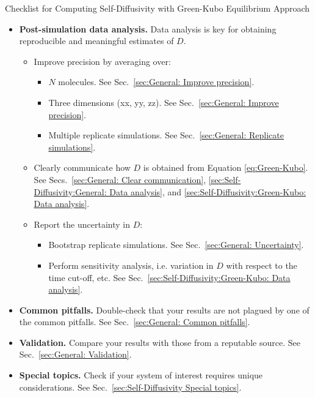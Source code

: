 \documentclass[9pt,bestpractices]{livecoms}
\begin{document}
\begin{Checklists*}[p!]
\begin{checklist}{Checklist for Computing Self-Diffusivity with Green-Kubo Equilibrium Approach}
\begin{itemize}
			\item
			\textbf{Post-simulation data analysis.} Data analysis is key for obtaining reproducible and meaningful estimates of $D$.
			\begin{itemize}
				\item Improve precision by averaging over:
				\begin{itemize}
					\item $N$ molecules. See Sec.\ \ref{sec:General: Improve precision}.
					\item Three dimensions (xx, yy, zz). See Sec.\ \ref{sec:General: Improve precision}.
					\item Multiple replicate simulations. See Sec.\ \ref{sec:General: Replicate simulations}.
				\end{itemize}
				\item Clearly communicate how $D$ is obtained from Equation \ref{eq:Green-Kubo}. See Secs.\ \ref{sec:General: Clear communication}, \ref{sec:Self-Diffusivity:General: Data analysis}, and \ref{sec:Self-Diffusivity:Green-Kubo: Data analysis}.
				\item Report the uncertainty in $D$:
				\begin{itemize}
					\item Bootstrap replicate simulations. See Sec.\ \ref{sec:General: Uncertainty}.
					\item Perform sensitivity analysis, i.e. variation in $D$ with respect to the time cut-off, etc. See Sec.\ \ref{sec:Self-Diffusivity:Green-Kubo: Data analysis}.
				\end{itemize}
			\end{itemize}
			\vspace{-0.325\baselineskip} %

			\item
			\textbf{Common pitfalls.} Double-check that your results are not plagued by one of the common pitfalls. See Sec.\ \ref{sec:General: Common pitfalls}.

			\item
			\textbf{Validation.} Compare your results with those from a reputable source. See Sec.\ \ref{sec:General: Validation}.

			\item
			\textbf{Special topics.} Check if your system of interest requires unique considerations. See Sec.\ \ref{sec:Self-Diffusivity Special topics}.

		\end{itemize}
	\end{checklist}
\end{Checklists*}
\end{document}
